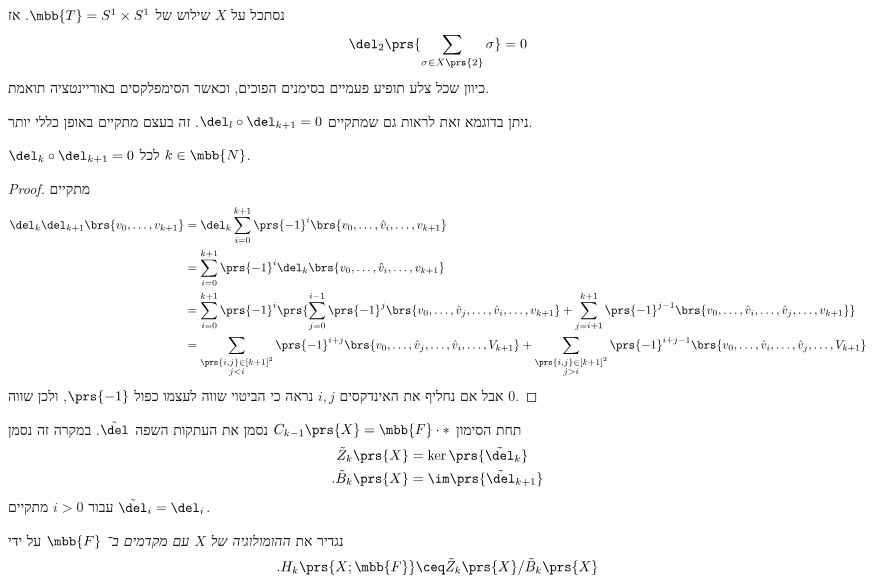 \documentclass[a4paper,10pt,twoside,openany]{book}
\begin{document}
\begin{example}
נסתכל על
$X$
שילוש של
$\mbb{T} = S^1 \times S^1$.
אז
\[\del_2 \prs{\sum_{\sigma \in X\prs{2}} \sigma} = 0\]
כיוון שכל צלע תופיע פעמיים בסימנים הפוכים, וכאשר הסימפלקסים באוריינטציה תואמת.

ניתן בדוגמא זאת לראות גם שמתקיים
$\del_l \circ \del_{k+1} = 0$.
זה בעצם מתקיים באופן כללי יותר.
\end{example}

\begin{proposition}
$\del_k \circ \del_{k+1} = 0$
לכל
$k \in \mbb{N}$.
\end{proposition}

\begin{proof}
מתקיים
\begin{align*}
\del_k \del_{k+1} \brs{v_0, \ldots, v_{k+1}}
&=
\del_k \sum_{i = 0}^{k+1} \prs{-1}^i \brs{v_0, \ldots, \hat{v}_i, \ldots, v_{k+1}}
\\&=
\sum_{i=0}^{k+1} \prs{-1}^i \del_k \brs{v_0, \ldots, \hat{v}_i, \ldots, v_{k+1}}
\\&=
\sum_{i = 0}^{k+1} \prs{-1}^i \prs{\sum_{j = 0}^{i-1} \prs{-1}^j \brs{v_0, \ldots, \hat{v}_j, \ldots, \hat{v}_i, \ldots, v_{k+1}}
+
\sum_{j = i+1}^{k+1} \prs{-1}^{j-1} \brs{v_0, \ldots, \hat{v}_i, \ldots, \hat{v}_j, \ldots, v_{k+1}}}
\\&=
\sum_{\substack{\prs{i,j} \in [k+1]^2 \\ j < i}} \prs{-1}^{i+j} \brs{v_0, \ldots, \hat{v}_j, \ldots, \hat{v}_i, \ldots, V_{k+1}}
+
\sum_{\substack{\prs{i,j} \in [k+1]^2 \\ j > i}} \prs{-1}^{i+j-1} \brs{v_0, \ldots, \hat{v}_i, \ldots, \hat{v}_j, \ldots, V_{k+1}}
\end{align*}
אבל אם נחליף את האינדקסים
$i,j$
נראה כי הביטוי שווה לעצמו כפול
$\prs{-1}$,
ולכן שווה
$0$.
\end{proof}

\begin{notation}
תחת הסימון
$C_{k-1}\prs{X} = \mbb{F} \cdot *$
נסמן את העתקות השפה
$\tilde{\del}$.
במקרה זה נסמן
\begin{align*}
\tilde{Z}_k\prs{X} &= \ker\prs{\tilde{\del}_k} \\
\text{.} \tilde{B}_k\prs{X} &= \im\prs{\tilde{\del}_{k+1}}
\end{align*}
עבור
$i > 0$
מתקיים
$\tilde{\del}_i = \del_i$.
\end{notation}

\begin{definition}[הומולוגיה]
נגדיר את
\emph{ההומולוגיה של
$X$
עם מקדמים ב־%
$\mbb{F}$}
על ידי
\[\text{.} H_k\prs{X ; \mbb{F}} \ceq \tilde{Z}_k\prs{X} / \tilde{B}_k\prs{X}\]
\end{definition}
\end{document}
